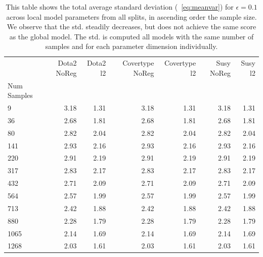 \begin{table}[!htb]
    \centering
    \caption[]{This table shows the total average standard deviation (\eq~\ref{eq:meanvar}) for $\epsilon=0.1$ across local model parameters from all splits, in ascending order \wrt the sample size. We observe that the std. steadily decreases, but does not achieve the same score as the global model. The std. is computed \wrt all models with the same number of samples and for each parameter dimension individually.
    }
    \label{tab:avg_std_01}
    \begin{tabular}{l||rr|rr|rr}
    \toprule
    {} &  Dota2 NoReg &  Dota2 l2 &  Covertype NoReg &  Covertype l2 &  Susy NoReg &  Susy l2 \\
    Num Samples &              &           &                  &               &             &          \\
    \midrule
    9           &         3.18 &      1.31 &             3.18 &          1.31 &        3.18 &     1.31 \\
    36          &         2.68 &      1.81 &             2.68 &          1.81 &        2.68 &     1.81 \\
    80          &         2.82 &      2.04 &             2.82 &          2.04 &        2.82 &     2.04 \\
    141         &         2.93 &      2.16 &             2.93 &          2.16 &        2.93 &     2.16 \\
    220         &         2.91 &      2.19 &             2.91 &          2.19 &        2.91 &     2.19 \\
    317         &         2.83 &      2.17 &             2.83 &          2.17 &        2.83 &     2.17 \\
    432         &         2.71 &      2.09 &             2.71 &          2.09 &        2.71 &     2.09 \\
    564         &         2.57 &      1.99 &             2.57 &          1.99 &        2.57 &     1.99 \\
    713         &         2.42 &      1.88 &             2.42 &          1.88 &        2.42 &     1.88 \\
    880         &         2.28 &      1.79 &             2.28 &          1.79 &        2.28 &     1.79 \\
    1065        &         2.14 &      1.69 &             2.14 &          1.69 &        2.14 &     1.69 \\
    1268        &         2.03 &      1.61 &             2.03 &          1.61 &        2.03 &     1.61 \\

\end{tabular}
\end{table}
